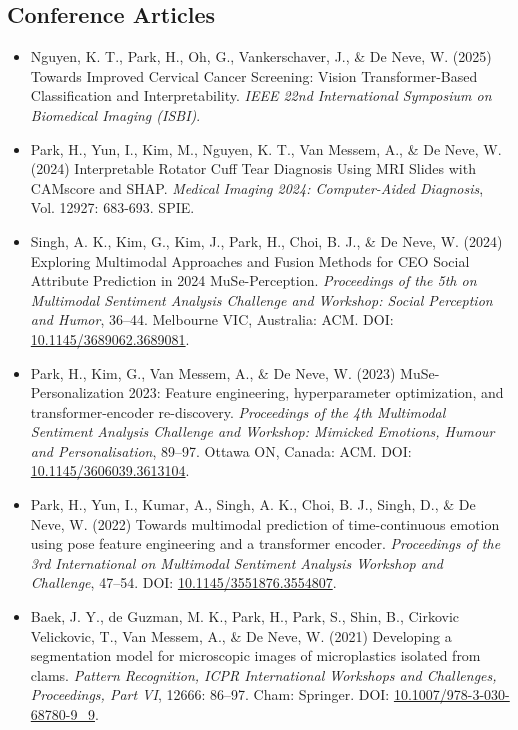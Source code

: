 \documentclass[11pt]{article}
\begin{document}
\subsection{Conference Articles}
\begin{itemize}
    \item[\checkmark] Nguyen, K. T., Park, H., Oh, G., Vankerschaver, J., \& De Neve, W. (2025) Towards Improved Cervical Cancer Screening: Vision Transformer-Based Classification and Interpretability. \textit{IEEE 22nd International Symposium on Biomedical Imaging (ISBI)}.
    \item[\checkmark] Park, H., Yun, I., Kim, M., Nguyen, K. T., Van Messem, A., \& De Neve, W. (2024) Interpretable Rotator Cuff Tear Diagnosis Using MRI Slides with CAMscore and SHAP. \textit{Medical Imaging 2024: Computer-Aided Diagnosis}, Vol. 12927: 683-693. SPIE.
    \item[\checkmark] Singh, A. K., Kim, G., Kim, J., Park, H., Choi, B. J., \& De Neve, W. (2024) Exploring Multimodal Approaches and Fusion Methods for CEO Social Attribute Prediction in 2024 MuSe-Perception. \textit{Proceedings of the 5th on Multimodal Sentiment Analysis Challenge and Workshop: Social Perception and Humor}, 36–44. Melbourne VIC, Australia: ACM. DOI: \href{https://doi.org/10.1145/3689062.3689081}{10.1145/3689062.3689081}.
    \item[\checkmark] Park, H., Kim, G., Van Messem, A., \& De Neve, W. (2023) MuSe-Personalization 2023: Feature engineering, hyperparameter optimization, and transformer-encoder re-discovery. \textit{Proceedings of the 4th Multimodal Sentiment Analysis Challenge and Workshop: Mimicked Emotions, Humour and Personalisation}, 89–97. Ottawa ON, Canada: ACM. DOI: \href{https://doi.org/10.1145/3606039.3613104}{10.1145/3606039.3613104}.
    \item[\checkmark] Park, H., Yun, I., Kumar, A., Singh, A. K., Choi, B. J., Singh, D., \& De Neve, W. (2022) Towards multimodal prediction of time-continuous emotion using pose feature engineering and a transformer encoder. \textit{Proceedings of the 3rd International on Multimodal Sentiment Analysis Workshop and Challenge}, 47–54. DOI: \href{https://doi.org/10.1145/3551876.3554807}{10.1145/3551876.3554807}.
    \item[\checkmark] Baek, J. Y., de Guzman, M. K., Park, H., Park, S., Shin, B., Cirkovic Velickovic, T., Van Messem, A., \& De Neve, W. (2021) Developing a segmentation model for microscopic images of microplastics isolated from clams. \textit{Pattern Recognition, ICPR International Workshops and Challenges, Proceedings, Part VI}, 12666: 86–97. Cham: Springer. DOI: \href{https://doi.org/10.1007/978-3-030-68780-9_9}{10.1007/978-3-030-68780-9\_9}.

\end{itemize}
\end{document}

